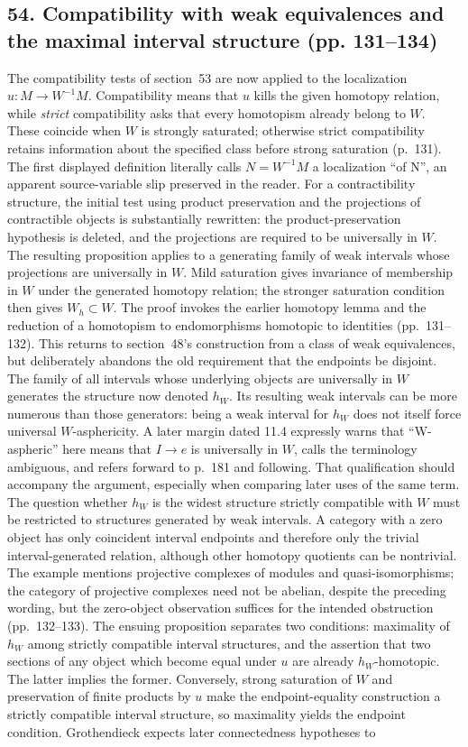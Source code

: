 \subsection*{54. Compatibility with weak equivalences and the maximal interval structure (pp. 131--134)}
The compatibility tests of section~53 are now applied to the localization $u:M\to W^{-1}M$. Compatibility means that $u$ kills the given homotopy relation, while \emph{strict} compatibility asks that every homotopism already belong to $W$. These coincide when $W$ is strongly saturated; otherwise strict compatibility retains information about the specified class before strong saturation (p.~131). The first displayed definition literally calls $N=W^{-1}M$ a localization ``of N'', an apparent source-variable slip preserved in the reader. For a contractibility structure, the initial test using product preservation and the projections of contractible objects is substantially rewritten: the product-preservation hypothesis is deleted, and the projections are required to be universally in $W$. The resulting proposition applies to a generating family of weak intervals whose projections are universally in $W$. Mild saturation gives invariance of membership in $W$ under the generated homotopy relation; the stronger saturation condition then gives $W_h\subset W$. The proof invokes the earlier homotopy lemma and the reduction of a homotopism to endomorphisms homotopic to identities (pp.~131--132). This returns to section~48's construction from a class of weak equivalences, but deliberately abandons the old requirement that the endpoints be disjoint. The family of all intervals whose underlying objects are universally in $W$ generates the structure now denoted $h_W$. Its resulting weak intervals can be more numerous than those generators: being a weak interval for $h_W$ does not itself force universal $W$-asphericity. A later margin dated 11.4 expressly warns that ``W-aspheric'' here means that $I\to e$ is universally in $W$, calls the terminology ambiguous, and refers forward to p.~181 and following. That qualification should accompany the argument, especially when comparing later uses of the same term. The question whether $h_W$ is the widest structure strictly compatible with $W$ must be restricted to structures generated by weak intervals. A category with a zero object has only coincident interval endpoints and therefore only the trivial interval-generated relation, although other homotopy quotients can be nontrivial. The example mentions projective complexes of modules and quasi-isomorphisms; the category of projective complexes need not be abelian, despite the preceding wording, but the zero-object observation suffices for the intended obstruction (pp.~132--133). The ensuing proposition separates two conditions: maximality of $h_W$ among strictly compatible interval structures, and the assertion that two sections of any object which become equal under $u$ are already $h_W$-homotopic. The latter implies the former. Conversely, strong saturation of $W$ and preservation of finite products by $u$ make the endpoint-equality construction a strictly compatible interval structure, so maximality yields the endpoint condition. Grothendieck expects later connectedness hypotheses to 